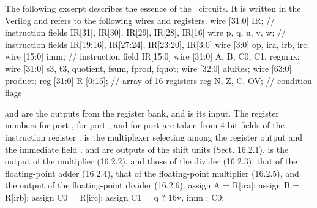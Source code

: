 \medskip
{}\medskip

The following excerpt describes the essence of the \ALU\ circuits. It is written in the  Verilog and refers to the following wires and registers.
\begintt
wire [31:0] IR;
// instruction fields IR[31], IR[30], IR[29], IR[28], IR[16]
wire p, q, u, v, w; 
// instruction fields IR[19:16], IR[27:24], IR[23:20], IR[3:0]
wire [3:0] op, ira, irb, irc; 
wire [15:0] imm; // instruction field IR[15:0]
wire [31:0] A, B, C0, C1, regmux;
wire [31:0] s3, t3, quotient, fsum, fprod, fquot;
wire [32:0] aluRes;
wire [63:0] product;
reg [31:0] R [0:15]; // array of 16 registers
reg N, Z, C, OV; // condition flags
\endtt


 and  are the outputs from the register bank, and  is its input. The register numbers  for port ,  for port , and  for port  are taken from 4-bit fields of the instruction register .  is the multiplexer selecting among the register output  and the immediate field .  and  are outputs of the shift units (Sect. 16.2.1).  is the output of the multiplier (16.2.2),  and  those of the divider (16.2.3),  that of the floating-point adder (16.2.4),  that of the floating-point multiplier (16.2.5), and  the output of the floating-point divider (16.2.6).
\begintt
assign A = R[ira];
assign B = R[irb];
assign C0 = R[irc];
assign C1 = q ? {{16{v}}, imm} : C0;
\endtt

